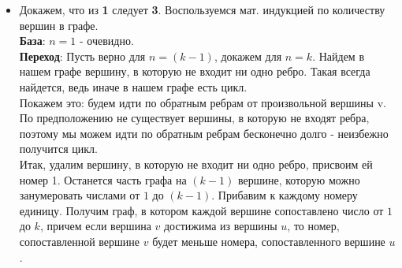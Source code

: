 \documentclass{article}
\begin{document}
\begin{itemize}
\begin{itemize}
        \item Докажем, что из \textbf{1} следует \textbf{3}. Воспользуемся мат. индукцией по количеству вершин в графе. \\
        \textbf{База}: $n = 1$ - очевидно. \\
        \textbf{Переход}: Пусть верно для $n = (k - 1)$, докажем для $n = k$. Найдем в нашем графе вершину, в которую не входит ни одно ребро. Такая всегда найдется, ведь иначе в нашем графе есть цикл. \\
        Покажем это: будем идти по обратным ребрам от произвольной вершины v. По предположению не существует вершины, в которую не входят ребра, поэтому мы можем идти по обратным ребрам бесконечно долго - неизбежно получится цикл. \\
        Итак, удалим вершину, в которую не входит ни одно ребро, присвоим ей номер 1. Останется часть графа на $(k - 1)$ вершине, которую можно занумеровать числами от $1$ до $(k - 1)$. Прибавим к каждому номеру единицу. Получим граф, в котором каждой вершине сопоставлено число от $1$ до $k$, причем если вершина $v$ достижима из вершины $u$, то номер, сопоставленной вершине $v$ будет меньше номера, сопоставленного вершине $u$.
        
        \end{itemize}
    \end{itemize}
\end{document}
